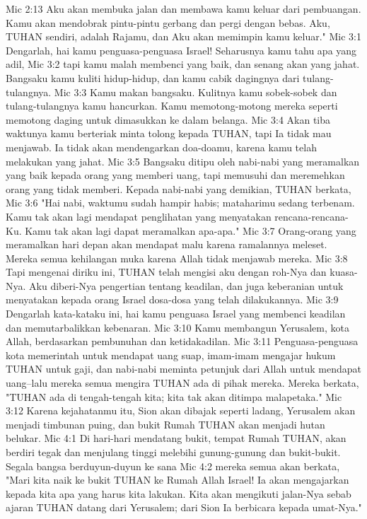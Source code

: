 Mic 2:13  Aku akan membuka jalan dan membawa kamu keluar dari pembuangan. Kamu akan mendobrak pintu-pintu gerbang dan pergi dengan bebas. Aku, TUHAN sendiri, adalah Rajamu, dan Aku akan memimpin kamu keluar."
Mic 3:1  Dengarlah, hai kamu penguasa-penguasa Israel! Seharusnya kamu tahu apa yang adil,
Mic 3:2  tapi kamu malah membenci yang baik, dan senang akan yang jahat. Bangsaku kamu kuliti hidup-hidup, dan kamu cabik dagingnya dari tulang-tulangnya.
Mic 3:3  Kamu makan bangsaku. Kulitnya kamu sobek-sobek dan tulang-tulangnya kamu hancurkan. Kamu memotong-motong mereka seperti memotong daging untuk dimasukkan ke dalam belanga.
Mic 3:4  Akan tiba waktunya kamu berteriak minta tolong kepada TUHAN, tapi Ia tidak mau menjawab. Ia tidak akan mendengarkan doa-doamu, karena kamu telah melakukan yang jahat.
Mic 3:5  Bangsaku ditipu oleh nabi-nabi yang meramalkan yang baik kepada orang yang memberi uang, tapi memusuhi dan meremehkan orang yang tidak memberi. Kepada nabi-nabi yang demikian, TUHAN berkata,
Mic 3:6  "Hai nabi, waktumu sudah hampir habis; mataharimu sedang terbenam. Kamu tak akan lagi mendapat penglihatan yang menyatakan rencana-rencana-Ku. Kamu tak akan lagi dapat meramalkan apa-apa."
Mic 3:7  Orang-orang yang meramalkan hari depan akan mendapat malu karena ramalannya meleset. Mereka semua kehilangan muka karena Allah tidak menjawab mereka.
Mic 3:8  Tapi mengenai diriku ini, TUHAN telah mengisi aku dengan roh-Nya dan kuasa-Nya. Aku diberi-Nya pengertian tentang keadilan, dan juga keberanian untuk menyatakan kepada orang Israel dosa-dosa yang telah dilakukannya.
Mic 3:9  Dengarlah kata-kataku ini, hai kamu penguasa Israel yang membenci keadilan dan memutarbalikkan kebenaran.
Mic 3:10  Kamu membangun Yerusalem, kota Allah, berdasarkan pembunuhan dan ketidakadilan.
Mic 3:11  Penguasa-penguasa kota memerintah untuk mendapat uang suap, imam-imam mengajar hukum TUHAN untuk gaji, dan nabi-nabi meminta petunjuk dari Allah untuk mendapat uang--lalu mereka semua mengira TUHAN ada di pihak mereka. Mereka berkata, "TUHAN ada di tengah-tengah kita; kita tak akan ditimpa malapetaka."
Mic 3:12  Karena kejahatanmu itu, Sion akan dibajak seperti ladang, Yerusalem akan menjadi timbunan puing, dan bukit Rumah TUHAN akan menjadi hutan belukar.
Mic 4:1  Di hari-hari mendatang bukit, tempat Rumah TUHAN, akan berdiri tegak dan menjulang tinggi melebihi gunung-gunung dan bukit-bukit. Segala bangsa berduyun-duyun ke sana
Mic 4:2  mereka semua akan berkata, "Mari kita naik ke bukit TUHAN ke Rumah Allah Israel! Ia akan mengajarkan kepada kita apa yang harus kita lakukan. Kita akan mengikuti jalan-Nya sebab ajaran TUHAN datang dari Yerusalem; dari Sion Ia berbicara kepada umat-Nya."
